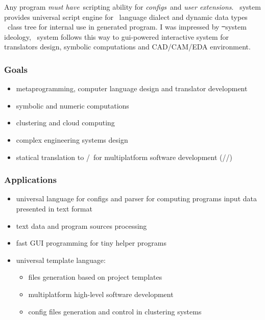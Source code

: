 

Any program \emph{must have}\ scripting ability for \emph{configs}\ and 
\emph{user extensions}. \bi\ system provides universal script engine for
\bi\ language dialect and dynamic data types \cpp\ class tree
for internal use in generated program.
I was impressed by \st\ system ideology, \bi\ system follows this way to
gui-powered interactive system for translators design, symbolic computations and
CAD/CAM/EDA environment.

\subsubsection{Goals}

\begin{itemize}[nosep]
\item metaprogramming, computer language design and translator development
\item symbolic and numeric computations
\item clustering and cloud computing
\item complex engineering systems design
\item statical translation to \cpp/\java\ for multiplatform software development
(\win/\lin/\andr) 
\end{itemize}

\subsubsection{Applications}

\begin{itemize}[nosep]
\item universal language for configs and parser for computing programs input data
presented in text format
\item text data and program sources processing  
\item fast GUI programming for tiny helper programs
\item universal template language:
\begin{itemize}[nosep]
\item files generation based on project templates
\item multiplatform high-level software development
\item config files generation and control in clustering systems
\end{itemize}
\end{itemize}
